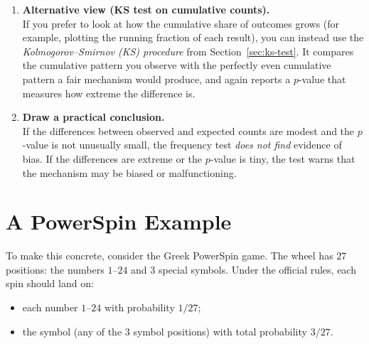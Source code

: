 \begin{enumerate}
  \item \textbf{Alternative view (KS test on cumulative counts).}\\
        If you prefer to look at how the cumulative share of outcomes grows (for example, plotting the running fraction of each result), you can instead use the \emph{Kolmogorov--Smirnov (KS) procedure} from Section~\ref{sec:ks-test}.  It compares the cumulative pattern you observe with the perfectly even cumulative pattern a fair mechanism would produce, and again reports a $p$-value that measures how extreme the difference is.

  \item \textbf{Draw a practical conclusion.}\\
        If the differences between observed and expected counts are modest and the $p$-value is not unusually small, the frequency test \emph{does not find} evidence of bias.  If the differences are extreme or the $p$-value is tiny, the test warns that the mechanism may be biased or malfunctioning.
\end{enumerate}



\section{A PowerSpin Example}
To make this concrete, consider the Greek PowerSpin game.  The wheel has \(27\) positions: the numbers \(1\)--\(24\) and 3 special symbols.  Under the official rules, each spin should land on:
\begin{itemize}
  \item each number \(1\)--\(24\) with probability \(1/27\);
  \item the symbol (any of the 3 symbol positions) with total probability \(3/27\).
\end{itemize}

